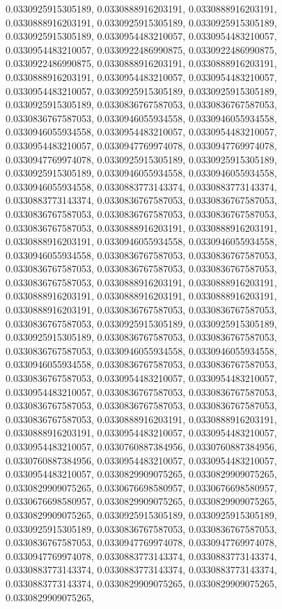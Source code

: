 \documentclass[
  ,man]{apa6}
\begin{document}
0.0330925915305189, 0.0330888916203191, 0.0330888916203191, 0.0330888916203191, 0.0330925915305189, 0.0330925915305189, 0.0330925915305189, 0.0330954483210057, 0.0330954483210057, 0.0330954483210057, 0.0330922486990875, 0.0330922486990875, 0.0330922486990875, 0.0330888916203191, 0.0330888916203191, 0.0330888916203191, 0.0330954483210057, 0.0330954483210057, 0.0330954483210057, 0.0330925915305189, 0.0330925915305189, 0.0330925915305189, 0.0330836767587053, 0.0330836767587053, 0.0330836767587053, 0.0330946055934558,
0.0330946055934558, 0.0330946055934558, 0.0330954483210057, 0.0330954483210057, 0.0330954483210057, 0.0330947769974078, 0.0330947769974078, 0.0330947769974078, 0.0330925915305189, 0.0330925915305189, 0.0330925915305189, 0.0330946055934558, 0.0330946055934558, 0.0330946055934558, 0.0330883773143374, 0.0330883773143374, 0.0330883773143374, 0.0330836767587053, 0.0330836767587053, 0.0330836767587053, 0.0330836767587053, 0.0330836767587053, 0.0330836767587053, 0.0330888916203191, 0.0330888916203191, 0.0330888916203191,
0.0330946055934558, 0.0330946055934558, 0.0330946055934558, 0.0330836767587053, 0.0330836767587053, 0.0330836767587053, 0.0330836767587053, 0.0330836767587053, 0.0330836767587053, 0.0330888916203191, 0.0330888916203191, 0.0330888916203191, 0.0330888916203191, 0.0330888916203191, 0.0330888916203191, 0.0330836767587053, 0.0330836767587053, 0.0330836767587053, 0.0330925915305189, 0.0330925915305189, 0.0330925915305189, 0.0330836767587053, 0.0330836767587053, 0.0330836767587053, 0.0330946055934558, 0.0330946055934558,
0.0330946055934558, 0.0330836767587053, 0.0330836767587053, 0.0330836767587053, 0.0330954483210057, 0.0330954483210057, 0.0330954483210057, 0.0330836767587053, 0.0330836767587053, 0.0330836767587053, 0.0330836767587053, 0.0330836767587053, 0.0330836767587053, 0.0330888916203191, 0.0330888916203191, 0.0330888916203191, 0.0330954483210057, 0.0330954483210057, 0.0330954483210057, 0.0330760887384956, 0.0330760887384956, 0.0330760887384956, 0.0330954483210057, 0.0330954483210057, 0.0330954483210057, 0.0330829909075265,
0.0330829909075265, 0.0330829909075265, 0.0330676698580957, 0.0330676698580957, 0.0330676698580957, 0.0330829909075265, 0.0330829909075265, 0.0330829909075265, 0.0330925915305189, 0.0330925915305189, 0.0330925915305189, 0.0330836767587053, 0.0330836767587053, 0.0330836767587053, 0.0330947769974078, 0.0330947769974078, 0.0330947769974078, 0.0330883773143374, 0.0330883773143374, 0.0330883773143374, 0.0330883773143374, 0.0330883773143374, 0.0330883773143374, 0.0330829909075265, 0.0330829909075265, 0.0330829909075265,
\end{document}
